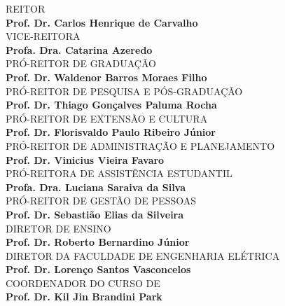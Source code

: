 \begin{center}
\parbox{0.8\textwidth}{
\textsc{\tiny REITOR} \\ \hspace*{5mm} \textbf{Prof. Dr. Carlos Henrique de Carvalho}\\
\textsc{\tiny VICE-REITORA} \\ \hspace*{5mm} \textbf{Profa. Dra. Catarina Azeredo}\\
\textsc{\tiny PRÓ-REITOR DE GRADUAÇÃO} \\ \hspace*{5mm} \textbf{Prof. Dr. Waldenor Barros Moraes Filho}\\
\textsc{\tiny PRÓ-REITOR DE PESQUISA E PÓS-GRADUAÇÃO} \\ \hspace*{5mm} \textbf{Prof. Dr. Thiago Gonçalves Paluma Rocha}\\
\textsc{\tiny PRÓ-REITOR DE EXTENSÃO E CULTURA} \\ \hspace*{5mm} \textbf{Prof. Dr. Florisvaldo Paulo Ribeiro Júnior}\\
\textsc{\tiny PRÓ-REITOR DE ADMINISTRAÇÃO E PLANEJAMENTO} \\ \hspace*{5mm} \textbf{Prof. Dr. Vinicius Vieira Favaro}\\
\textsc{\tiny PRÓ-REITORA DE ASSISTÊNCIA ESTUDANTIL} \\ \hspace*{5mm} \textbf{Profa. Dra. Luciana Saraiva da Silva}\\
\textsc{\tiny PRÓ-REITOR DE GESTÃO DE PESSOAS} \\ \hspace*{5mm} \textbf{Prof. Dr. Sebastião Elias da Silveira}\\
\textsc{\tiny DIRETOR DE ENSINO} \\ \hspace*{5mm} \textbf{Prof. Dr. Roberto Bernardino Júnior}\\
\textsc{\tiny DIRETOR DA FACULDADE DE ENGENHARIA ELÉTRICA} \\ \hspace*{5mm} \textbf{Prof. Dr. Lorenço Santos Vasconcelos}\\
\textsc{\tiny COORDENADOR DO CURSO DE \MakeUppercase{\nomecursonovo}} \\ \hspace*{5mm} \textbf{Prof. Dr. Kil Jin Brandini Park}
}
\end{center}\setlength{\parskip}{1cm}


